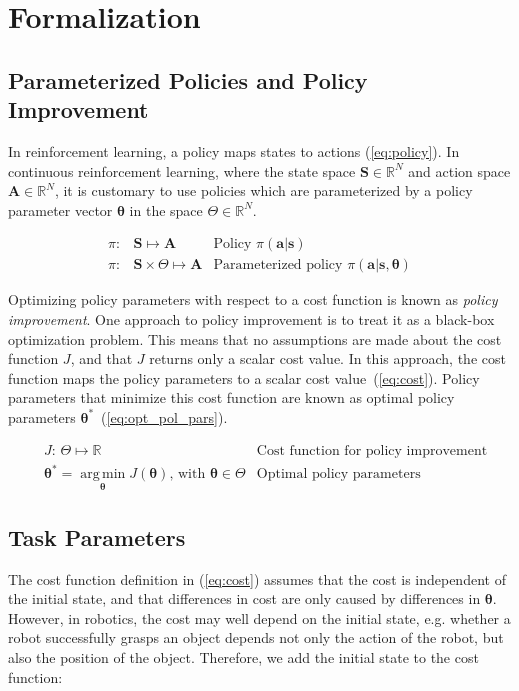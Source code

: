 \documentclass[12pt]{article}
\newcommand{\mymath}[1]{\ensuremath{#1}\xspace}
\newcommand{\act}    {\mymath{\mathbf{a}}}
\newcommand{\actsp}  {\mymath{\mathbf{A}}}
\newcommand{\sta}    {\mymath{\mathbf{s}}}
\newcommand{\stasp}  {\mymath{\mathbf{S}}}
\newcommand{\app}    {\mymath{\bm{\theta}}}
\newcommand{\appsp}  {\mymath{\Theta}}
\newcommand{\costf}  {\mymath{J}}
\DeclareMathOperator*{\argmin}{arg\,min}
\newcommand{\argminvar}[1]{\ensuremath{\underset{#1}{{\argmin}}}}
\begin{document}
\section{Formalization}

\subsection{Parameterized Policies and Policy Improvement}
\label{sec:parameterized_policies}

In reinforcement learning, a policy maps states to actions (\ref{eq:policy}). In continuous reinforcement learning, where the state space $\stasp \in \mathbb{R}^N$ and action space $\actsp \in \mathbb{R}^N$,  it is customary to use policies which are parameterized by a policy parameter vector \app in the space $\appsp  \in \mathbb{R}^N$.

\begin{align}
\label{eq:policy}     \pi:& \stasp               \mapsto \actsp & \mbox{Policy~} \pi(\act|\sta)\\
\label{eq:policy_par} \pi:& \stasp \times \appsp \mapsto \actsp & \mbox{Parameterized policy~} \pi(\act|\sta,\app)
\end{align}


Optimizing policy parameters with respect to a cost function is known as \emph{policy improvement}. 
One approach to policy improvement is to treat it as a black-box optimization problem. This means that no assumptions are made about the cost function $J$, and that $J$ returns only a scalar cost value. In this approach, the cost function maps the policy parameters to a scalar cost value~(\ref{eq:cost}). Policy parameters that minimize this cost function are known as optimal policy parameters $\app^*$~(\ref{eq:opt_pol_pars}).

\begin{align}
& \costf\mbox{: } \appsp \mapsto \mathbb{R}&\mbox{Cost function for policy improvement}\label{eq:cost}\\
& \app^* = \argminvar{\app}\costf(\app) \mbox{,~with~} \app\in\appsp  & \mbox{Optimal policy parameters}\label{eq:opt_pol_pars}
\end{align}

\subsection{Task Parameters}

The cost function definition in (\ref{eq:cost}) assumes that the cost is independent of the initial state, and that differences in cost are only caused by differences in \app. However, in robotics, the cost may well depend on the initial state, e.g. whether a robot successfully grasps an object depends not only the action of the robot, but also the position of the object. Therefore, we add the initial state to the cost function:
\end{document}
